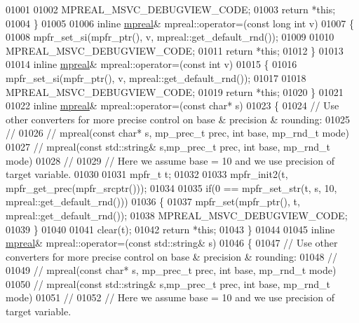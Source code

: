 \begin{DoxyCode}
01001 
01002     MPREAL\_MSVC\_DEBUGVIEW\_CODE;
01003     \textcolor{keywordflow}{return} *\textcolor{keyword}{this};
01004 \}
01005 
01006 \textcolor{keyword}{inline} \hyperlink{classmpfr_1_1mpreal}{mpreal}& mpreal::operator=(\textcolor{keyword}{const} \textcolor{keywordtype}{long} \textcolor{keywordtype}{int} v)
01007 \{
01008     mpfr\_set\_si(mpfr\_ptr(), v, mpreal::get\_default\_rnd());
01009 
01010     MPREAL\_MSVC\_DEBUGVIEW\_CODE;
01011     \textcolor{keywordflow}{return} *\textcolor{keyword}{this};
01012 \}
01013 
01014 \textcolor{keyword}{inline} \hyperlink{classmpfr_1_1mpreal}{mpreal}& mpreal::operator=(\textcolor{keyword}{const} \textcolor{keywordtype}{int} v)
01015 \{
01016     mpfr\_set\_si(mpfr\_ptr(), v, mpreal::get\_default\_rnd());
01017 
01018     MPREAL\_MSVC\_DEBUGVIEW\_CODE;
01019     \textcolor{keywordflow}{return} *\textcolor{keyword}{this};
01020 \}
01021 
01022 \textcolor{keyword}{inline} \hyperlink{classmpfr_1_1mpreal}{mpreal}& mpreal::operator=(\textcolor{keyword}{const} \textcolor{keywordtype}{char}* s)
01023 \{
01024     \textcolor{comment}{// Use other converters for more precise control on base & precision & rounding:}
01025     \textcolor{comment}{//}
01026     \textcolor{comment}{//        mpreal(const char* s,        mp\_prec\_t prec, int base, mp\_rnd\_t mode)}
01027     \textcolor{comment}{//        mpreal(const std::string& s,mp\_prec\_t prec, int base, mp\_rnd\_t mode)}
01028     \textcolor{comment}{//}
01029     \textcolor{comment}{// Here we assume base = 10 and we use precision of target variable.}
01030 
01031     mpfr\_t t;
01032 
01033     mpfr\_init2(t, mpfr\_get\_prec(mpfr\_srcptr()));
01034 
01035     \textcolor{keywordflow}{if}(0 == mpfr\_set\_str(t, s, 10, mpreal::get\_default\_rnd()))
01036     \{
01037         mpfr\_set(mpfr\_ptr(), t, mpreal::get\_default\_rnd());
01038         MPREAL\_MSVC\_DEBUGVIEW\_CODE;
01039     \}
01040 
01041     clear(t);
01042     \textcolor{keywordflow}{return} *\textcolor{keyword}{this};
01043 \}
01044 
01045 \textcolor{keyword}{inline} \hyperlink{classmpfr_1_1mpreal}{mpreal}& mpreal::operator=(\textcolor{keyword}{const} std::string& s)
01046 \{
01047     \textcolor{comment}{// Use other converters for more precise control on base & precision & rounding:}
01048     \textcolor{comment}{//}
01049     \textcolor{comment}{//        mpreal(const char* s,        mp\_prec\_t prec, int base, mp\_rnd\_t mode)}
01050     \textcolor{comment}{//        mpreal(const std::string& s,mp\_prec\_t prec, int base, mp\_rnd\_t mode)}
01051     \textcolor{comment}{//}
01052     \textcolor{comment}{// Here we assume base = 10 and we use precision of target variable.}

\end{DoxyCode}
